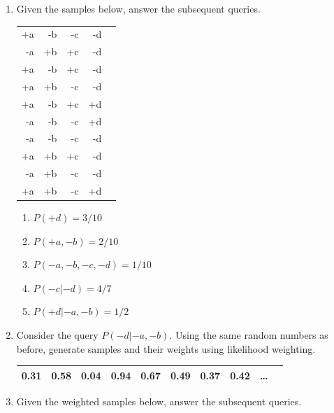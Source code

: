 \documentclass[12pt]{article}
\begin{document}
\begin{enumerate}
\item Given the samples below, answer the subsequent queries.

\begin{flushleft}
\begin{tabular}{rrrrr} 
+a & -b & -c & -d  \\
-a & +b & +c & -d  \\
+a & -b & +c & -d  \\
+a & +b & -c & -d  \\
+a & -b & +c & +d  \\
-a & -b & -c & +d  \\
-a & -b & -c & -d  \\
+a & +b & +c & -d  \\
-a & +b & -c & -d  \\
+a & +b & -c & +d  \\
\end{tabular}
\end{flushleft}

\begin{enumerate}

  \item $P(+d) = 3/10$

  \item $P(+a,-b) = 2/10$

  \item $P(-a,-b,-c,-d) = 1/10$

  \item $P(-c | -d) = 4/7$

  \item $P(+d | -a, -b) = 1/2$

\end{enumerate}

\item Consider the query $P(-d|-a,-b)$.  Using the same random numbers
  as before, generate samples and their weights using likelihood
  weighting.

\begin{center}
\begin{tabular}{|c|c|c|c|c|c|c|c|c|c|} \hline
0.31 & 0.58 & 0.04 & 0.94 & 0.67 & 0.49 & 0.37 & 0.42 & \ldots \\ \hline
\end{tabular}
\end{center}

\item Given the weighted samples below, answer the subsequent queries.


\end{enumerate}
\end{document}
